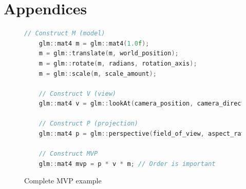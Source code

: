 \documentclass[11pt]{article}
\begin{document}
\clearpage
\printglossary[type=\acronymtype]






\section{Appendices}
\begin{figure}[ht]
  \centering
  \begin{lstlisting}[language=C++]
    // Construct M (model)
    glm::mat4 m = glm::mat4(1.0f);
    m = glm::translate(m, world_position);   
    m = glm::rotate(m, radians, rotation_axis); 
    m = glm::scale(m, scale_amount);

    // Construct V (view)
    glm::mat4 v = glm::lookAt(camera_position, camera_direction, camera_up);

    // Construct P (projection)
    glm::mat4 p = glm::perspective(field_of_view, aspect_ratio, near, far);

    // Construct MVP
    glm::mat4 mvp = p * v * m; // Order is important

  \end{lstlisting}
  \caption{Complete MVP example}
  \label{fig:local_to_world_appendix}
\end{figure}
\end{document}
